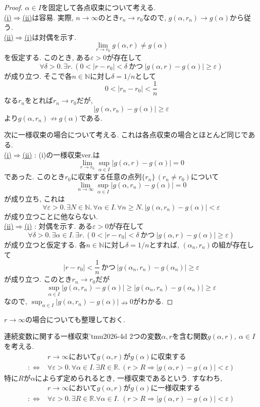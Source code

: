 \documentclass[titlepage]{jsarticle}
\numberwithin{equation}{section}
\newcommand{\N}{\mathbb{N}}%
\newcommand{\R}{\mathbb{R}}%
\begin{document}
\begin{proof}
$\alpha \in I$を固定して各点収束について考える.\\
\uline{(i)$\Rightarrow$(ii)}は容易. 実際, $n \to \infty$のとき$r_n \to r_0$なので, $g(\alpha, r_n) \to g(\alpha)$から従う.\\
\uline{(ii)$\Rightarrow$(i)}は対偶を示す.
\[
\lim_{r \to r_0} g(\alpha, r) \ne g(\alpha)
\]
を仮定する. このとき, ある$\varepsilon > 0$が存在して
\[
\forall \delta>0.\,\exists r.\,\left(0 < |r -r_0| < \delta\:\text{かつ}\: |g(\alpha, r) - g(\alpha)| \ge \varepsilon \right)
\]
が成り立つ. そこで各$n \in \N$に対し$\delta = 1/n$として
\[
0 < |r_n - r_0| < \frac{1}{n}
\]
なる$r_n$をとれば$r_n \to r_0$だが,
\[
|g(\alpha, r_n) - g(\alpha)| \ge \varepsilon
\]
より$g(\alpha, r_n) \nrightarrow g(\alpha)$である.

次に一様収束の場合について考える. これは各点収束の場合とほとんど同じである.\\
\uline{(i)$\Rightarrow$(ii)} : (i)の一様収束ver.は
\[
\lim_{r \to r_0} \sup_{\alpha \in I} |g(\alpha, r) - g(\alpha)| = 0
\]
であった. このとき$r_0$に収束する任意の点列$\{r_n\}\,(r_n \ne r_0)$について
\[
\lim_{n \to \infty} \sup_{\alpha \in I}|g(\alpha, r_n) - g(\alpha)| = 0
\]
が成り立ち, これは
\[
\forall \varepsilon>0.\,\exists N\in \N.\,\forall \alpha \in I.\,\forall n \ge N.\,|g(\alpha, r_n)-g(\alpha)| < \varepsilon
\]
が成り立つことに他ならない.\\
\uline{(ii)$\Rightarrow$(i)} : 対偶を示す. ある$\varepsilon > 0$が存在して
\[
\forall \delta>0.\,\exists \alpha \in I.\,\exists r.\,\left(0 < |r -r_0| < \delta\:\text{かつ}\: |g(\alpha, r) - g(\alpha)| \ge \varepsilon \right)
\]
が成り立つと仮定する. 各$n \in \N$に対し$\delta = 1/n$とすれば, $(\alpha_n, r_n)$の組が存在して
\[
|r - r_0| < \frac{1}{n}\:\text{かつ}\:|g(\alpha_n, r_n) - g(\alpha_n)| \ge \varepsilon
\]
が成り立つ. このとき$r_n \to r_0$だが
\[
\sup_{\alpha \in I}|g(\alpha, r_n) - g(\alpha)| \ge |g(\alpha_n, r_n) - g(\alpha_n)| \ge \varepsilon
\]
なので, $\sup_{\alpha \in I} |g(\alpha, r_n) - g(\alpha)| \nrightarrow 0$がわかる.
\end{proof}
$r \to \infty$の場合についても整理しておく.
\begin{dfn}{連続変数に関する一様収束'}{tmu2026-4d}
2つの変数$\alpha, r$を含む関数$g(\alpha, r),\:\alpha \in I$を考える.
\begin{align*}
&r \to \infty\text{において}g(\alpha, r)\text{が}g(\alpha)\text{に収束する}\\
:\Longleftrightarrow & \forall \varepsilon >0.\,\forall \alpha \in I.\, \exists R\in\R.\, \left(r > R \Rightarrow |g(\alpha,r) - g(\alpha) | < \varepsilon \right)
\end{align*}
特に$R$が$\alpha$によらず定められるとき, 一様収束であるという. すなわち,
\begin{align*}
&r \to \infty\text{において}g(\alpha, r)\text{が}g(\alpha)\text{に一様収束する}\\
:\Longleftrightarrow & \forall \varepsilon >0.\,\exists R\in \R.\forall \alpha \in I.\, \, \left(r > R \Rightarrow |g(\alpha,r) - g(\alpha) | < \varepsilon \right)
\end{align*}
\end{dfn}
\end{document}
